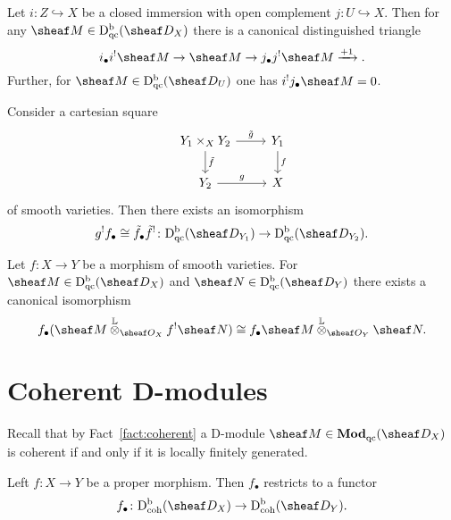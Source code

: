 \documentclass[number-in-sections,a4paper]{notes}
\begin{document}
\begin{Proposition}\label{prop:standard-triangle}
    Let $i\colon Z \hookrightarrow X$ be a closed immersion with open complement $j\colon U \hookrightarrow X$.
    Then for any $\sheaf M \in \catDbDModqc{X}$ there is a canonical distinguished triangle
    \[
        i_\bullet i^!\sheaf M \to \sheaf M \to j_\bullet j^!\sheaf M \xrightarrow{+1}.
    \]
    Further, for $\sheaf M \in \catDbDModqc{U}$ one has $i^!j_\bullet \sheaf M = 0$.
\end{Proposition}

\begin{Proposition}\label{prop:base-change}
    Consider a cartesian square
    \[
        \begin{tikzcd}
            Y_1 \times_X Y_2 \arrow[r,"\tilde g"] \arrow[d, "\tilde f"] & Y_1 \arrow[d,"f"] \\
            Y_2 \arrow[r, "g"] & X
        \end{tikzcd}
    \]
    of smooth varieties.
    Then there exists an isomorphism
    \[
        g^! f_\bullet \cong \tilde f_\bullet \tilde f^! \colon \catDbDModqc{Y_1} \to \catDbDModqc{Y_2}.
    \]
\end{Proposition}

\begin{Proposition}
    Let $f\colon X \to Y$ be a morphism of smooth varieties.
    For $\sheaf M \in \catDbDModqc{X}$ and $\sheaf N \in \catDbDModqc{Y}$ there exists a canonical isomorphism
    \[
        f_\bullet(\sheaf M \Lotimes_{\sO_X} f^! \sheaf N) \cong f_\bullet\sheaf M \Lotimes_{\sO_Y} \sheaf N.
    \]
\end{Proposition}

\section{Coherent D-modules}

Recall that by Fact~\ref{fact:coherent} a D-module $\sheaf M \in \catDModqc{X}$ is coherent if and only if it is locally finitely generated.

\begin{Theorem}\label{thm:pushforward-of-coherent}
    Left $f\colon X \to Y$ be a proper morphism. Then $f_\bullet$ restricts to a functor
    \[
        f_\bullet\colon \catDbDModcoh{X} \to \catDbDModcoh{Y}.
    \]
\end{Theorem}
\end{document}
